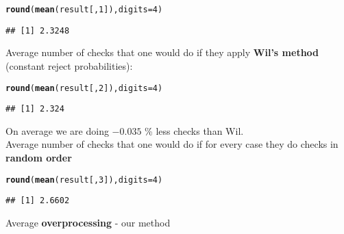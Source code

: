 \documentclass{article}\usepackage[]{graphicx}\usepackage[]{color}
\makeatletter
\newcommand{\hlnum}[1]{\textcolor[rgb]{0.686,0.059,0.569}{#1}}%
\newcommand{\hlstd}[1]{\textcolor[rgb]{0.345,0.345,0.345}{#1}}%
\newcommand{\hlkwc}[1]{\textcolor[rgb]{0.333,0.667,0.333}{#1}}%
\newcommand{\hlkwd}[1]{\textcolor[rgb]{0.737,0.353,0.396}{\textbf{#1}}}%
\newenvironment{kframe}{%
 \def\at@end@of@kframe{}%
 \ifinner\ifhmode%
  \def\at@end@of@kframe{\end{minipage}}%
  \begin{minipage}{\columnwidth}%
 \fi\fi%
 \def\FrameCommand##1{\hskip\@totalleftmargin \hskip-\fboxsep
 \colorbox{shadecolor}{##1}\hskip-\fboxsep
     \hskip-\linewidth \hskip-\@totalleftmargin \hskip\columnwidth}%
 \MakeFramed {\advance\hsize-\width
   \@totalleftmargin\z@ \linewidth\hsize
   \@setminipage}}%
 {\par\unskip\endMakeFramed%
 \at@end@of@kframe}
\newenvironment{knitrout}{}{} %
\makeatother
\begin{document}
\begin{knitrout}
\color{fgcolor}\begin{kframe}
\begin{alltt}
\hlkwd{round}\hlstd{(}\hlkwd{mean}\hlstd{(result[,}\hlnum{1}\hlstd{]),}\hlkwc{digits} \hlstd{=} \hlnum{4}\hlstd{)}
\end{alltt}
\begin{verbatim}
## [1] 2.3248
\end{verbatim}
\end{kframe}
\end{knitrout}

Average number of checks that one would do if they apply \textbf{Wil's method} (constant reject probabilities):

\begin{knitrout}
\color{fgcolor}\begin{kframe}
\begin{alltt}
\hlkwd{round}\hlstd{(}\hlkwd{mean}\hlstd{(result[,}\hlnum{2}\hlstd{]),}\hlkwc{digits} \hlstd{=} \hlnum{4}\hlstd{)}
\end{alltt}
\begin{verbatim}
## [1] 2.324
\end{verbatim}
\end{kframe}
\end{knitrout}


 
On average we are doing \textbf{\ensuremath{-0.035}} \% less checks than Wil. \\

Average number of checks that one would do if for every case they do checks in \textbf{random order}

\begin{knitrout}
\color{fgcolor}\begin{kframe}
\begin{alltt}
\hlkwd{round}\hlstd{(}\hlkwd{mean}\hlstd{(result[,}\hlnum{3}\hlstd{]),}\hlkwc{digits} \hlstd{=} \hlnum{4}\hlstd{)}
\end{alltt}
\begin{verbatim}
## [1] 2.6602
\end{verbatim}
\end{kframe}
\end{knitrout}

Average \textbf{overprocessing} - our method
\end{document}
